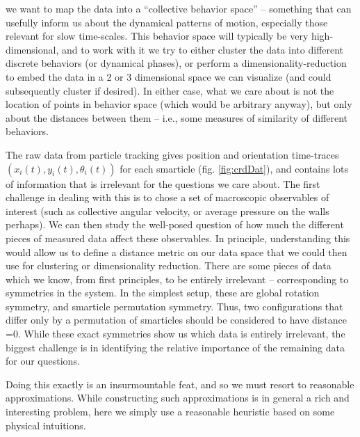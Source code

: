 \documentclass[reprint,prx]{revtex4-1}
\renewcommand{\=}[1]{\stackrel{#1}{=}} %
\renewcommand{\(}{\left (}
\renewcommand{\)}{\right  )}
\renewcommand{\[}{\left [}
\renewcommand{\]}{\right ]}
\newcommand{\<}{\left <}
\renewcommand{\>}{\right >}
\theoremstyle{definition}
\theoremstyle{remark}
\begin{document}
we want to map the data into a ``collective behavior space'' -- something that can usefully inform us about the dynamical patterns of motion, especially those relevant for slow time-scales. This behavior space will typically be very high-dimensional, and to work with it we try to either cluster the data into different discrete behaviors (or dynamical phases), or perform a dimensionality-reduction to embed the data in a 2 or 3 dimensional space we can visualize (and could subsequently cluster if desired). In either case, what we care about is not the location of points in behavior space (which would be arbitrary anyway), but only about the distances between them -- i.e., some measures of similarity of different behaviors. 

The raw data from particle tracking gives position and orientation time-traces $ (x_i(t), y_i(t), \theta_i(t)) $ for each smarticle (fig. \ref{fig:crdDat}), and contains lots of information that is irrelevant for the questions we care about. The first challenge in dealing with this is to chose a set of macroscopic observables of interest (such as collective angular velocity, or average pressure on the walls perhaps). We can then study the well-posed question of how much the different pieces of measured data affect these observables. In principle, understanding this would allow us to define a distance metric on our data space that we could then use for clustering or dimensionality reduction. There are some pieces of data which we know, from first principles, to be entirely irrelevant -- corresponding to symmetries in the system. In the simplest setup, these are global rotation symmetry, and smarticle permutation symmetry. Thus, two configurations that differ only by a permutation of smarticles should be considered to have distance =0. While these exact symmetries show us which data is entirely irrelevant, the biggest challenge is in identifying the relative importance of the remaining data for our questions. 

Doing this exactly is an insurmountable feat, and so we must resort to reasonable approximations. While constructing such approximations is in general a rich and interesting problem, here we simply use a reasonable heuristic based on some physical intuitions. 
\end{document}
